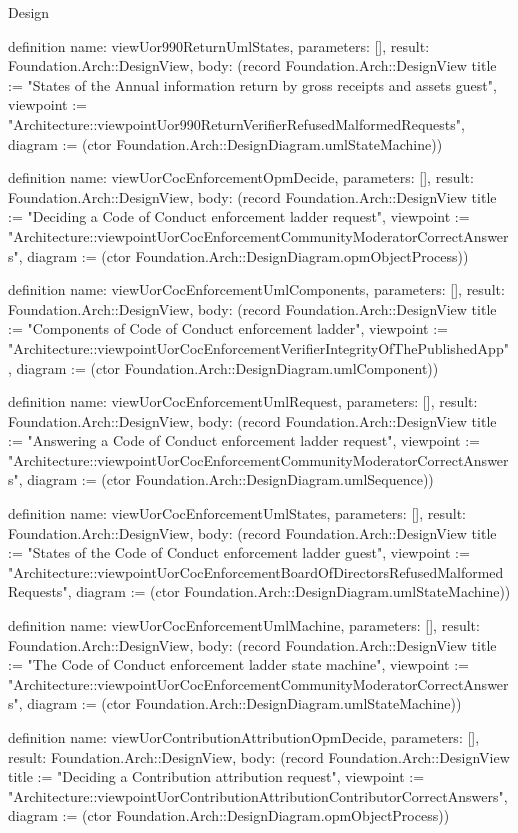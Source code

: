 \begin{lexlean}{Design}
\begin{semanticmodule}
definition{
  name: viewUor990ReturnUmlStates,
  parameters: [],
  result: Foundation.Arch::DesignView,
  body: (record Foundation.Arch::DesignView {title := "States of the Annual information return by gross receipts and assets guest", viewpoint := "Architecture::viewpointUor990ReturnVerifierRefusedMalformedRequests", diagram := (ctor Foundation.Arch::DesignDiagram.umlStateMachine)})
}

definition{
  name: viewUorCocEnforcementOpmDecide,
  parameters: [],
  result: Foundation.Arch::DesignView,
  body: (record Foundation.Arch::DesignView {title := "Deciding a Code of Conduct enforcement ladder request", viewpoint := "Architecture::viewpointUorCocEnforcementCommunityModeratorCorrectAnswers", diagram := (ctor Foundation.Arch::DesignDiagram.opmObjectProcess)})
}

definition{
  name: viewUorCocEnforcementUmlComponents,
  parameters: [],
  result: Foundation.Arch::DesignView,
  body: (record Foundation.Arch::DesignView {title := "Components of Code of Conduct enforcement ladder", viewpoint := "Architecture::viewpointUorCocEnforcementVerifierIntegrityOfThePublishedApp", diagram := (ctor Foundation.Arch::DesignDiagram.umlComponent)})
}

definition{
  name: viewUorCocEnforcementUmlRequest,
  parameters: [],
  result: Foundation.Arch::DesignView,
  body: (record Foundation.Arch::DesignView {title := "Answering a Code of Conduct enforcement ladder request", viewpoint := "Architecture::viewpointUorCocEnforcementCommunityModeratorCorrectAnswers", diagram := (ctor Foundation.Arch::DesignDiagram.umlSequence)})
}

definition{
  name: viewUorCocEnforcementUmlStates,
  parameters: [],
  result: Foundation.Arch::DesignView,
  body: (record Foundation.Arch::DesignView {title := "States of the Code of Conduct enforcement ladder guest", viewpoint := "Architecture::viewpointUorCocEnforcementBoardOfDirectorsRefusedMalformedRequests", diagram := (ctor Foundation.Arch::DesignDiagram.umlStateMachine)})
}

definition{
  name: viewUorCocEnforcementUmlMachine,
  parameters: [],
  result: Foundation.Arch::DesignView,
  body: (record Foundation.Arch::DesignView {title := "The Code of Conduct enforcement ladder state machine", viewpoint := "Architecture::viewpointUorCocEnforcementCommunityModeratorCorrectAnswers", diagram := (ctor Foundation.Arch::DesignDiagram.umlStateMachine)})
}

definition{
  name: viewUorContributionAttributionOpmDecide,
  parameters: [],
  result: Foundation.Arch::DesignView,
  body: (record Foundation.Arch::DesignView {title := "Deciding a Contribution attribution request", viewpoint := "Architecture::viewpointUorContributionAttributionContributorCorrectAnswers", diagram := (ctor Foundation.Arch::DesignDiagram.opmObjectProcess)})
}


\end{semanticmodule}
\end{lexlean}
